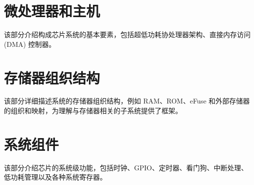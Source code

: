 \documentclass[openany, 10pt]{book}
\begin{document}
\setchineseformatting




\clearpage

\clearpage


\tableofcontents
\clearpage
\listoftables
\clearpage
\listoffigures






\part{微处理器和主机}


该部分介绍构成芯片系统的基本要素，包括超低功耗协处理器架构、直接内存访问 (DMA) 控制器。


\part{存储器组织结构}

该部分详细描述系统的存储器组织结构，例如 RAM、ROM、eFuse 和外部存储器的组织和映射，为理解与存储器相关的子系统提供了框架。


\part{系统组件}


该部分介绍芯片的系统级功能，包括时钟、GPIO、定时器、看门狗、中断处理、低功耗管理以及各种系统寄存器。
\end{document}
